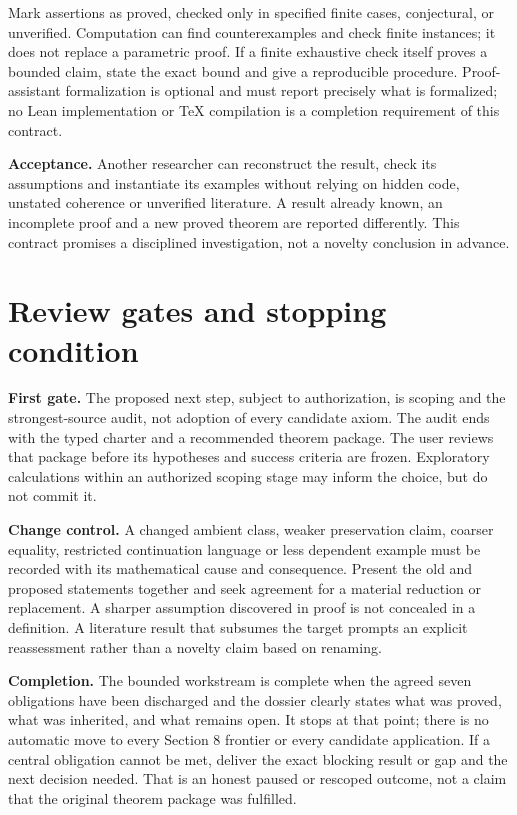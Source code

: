 \documentclass[11pt,a4paper]{article}
\begin{document}
Mark assertions as proved, checked only in specified finite cases,
conjectural, or unverified. Computation can find counterexamples and check
finite instances; it does not replace a parametric proof. If a finite exhaustive
check itself proves a bounded claim, state the exact bound and give a
reproducible procedure. Proof-assistant formalization is optional and must
report precisely what is formalized; no Lean implementation or TeX compilation
is a completion requirement of this contract.

\textbf{Acceptance.} Another researcher can reconstruct the result, check its
assumptions and instantiate its examples without relying on hidden code,
unstated coherence or unverified literature. A result already known, an
incomplete proof and a new proved theorem are reported differently. This
contract promises a disciplined investigation, not a novelty conclusion in
advance.

\section{Review gates and stopping condition}

\textbf{First gate.} The proposed next step, subject to authorization, is scoping
and the strongest-source audit, not adoption of every candidate axiom. The audit
ends with the typed charter and a recommended theorem package. The user reviews
that package before its hypotheses and success criteria are frozen. Exploratory
calculations within an authorized scoping stage may inform the choice, but do
not commit it.

\textbf{Change control.} A changed ambient class, weaker preservation claim,
coarser equality, restricted continuation language or less dependent example
must be recorded with its mathematical cause and consequence. Present the old
and proposed statements together and seek agreement for a material reduction
or replacement. A sharper assumption discovered in proof is not concealed in
a definition. A literature result that subsumes the target prompts an explicit
reassessment rather than a novelty claim based on renaming.

\textbf{Completion.} The bounded workstream is complete when the agreed seven
obligations have been discharged and the dossier clearly states what was
proved, what was inherited, and what remains open. It stops at that point;
there is no automatic move to every Section 8 frontier or every candidate
application. If a central obligation cannot be met, deliver the exact blocking
result or gap and the next decision needed. That is an honest paused or
rescoped outcome, not a claim that the original theorem package was fulfilled.
\end{document}
